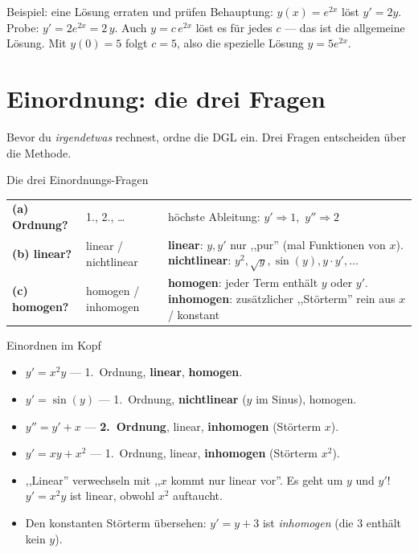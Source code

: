 \documentclass[a4paper,11pt]{article}
\begin{document}
\begin{bspbox}{Beispiel: eine Lösung erraten und prüfen}
Behauptung: $y(x)=e^{2x}$ löst $y'=2y$. Probe: $y'=2e^{2x}=2\,y$. \checkmark\;
Auch $y=c\,e^{2x}$ löst es für jedes $c$ — das ist die allgemeine Lösung. Mit $y(0)=5$
folgt $c=5$, also die spezielle Lösung $y=5e^{2x}$.
\end{bspbox}

\section{Einordnung: die drei Fragen}

Bevor du \emph{irgendetwas} rechnest, ordne die DGL ein. Drei Fragen entscheiden über die Methode.

\begin{defbox}{Die drei Einordnungs-Fragen}
\renewcommand{\arraystretch}{1.3}
\begin{tabular}{@{}p{3.1cm}p{4.1cm}p{7.5cm}@{}}
\textbf{(a) Ordnung?} & 1., 2., \dots & höchste Ableitung: $y'\Rightarrow1$,\ $y''\Rightarrow2$ \\
\textbf{(b) linear?} & linear / nichtlinear &
  \textbf{linear}: $y,y'$ nur ,,pur'' (mal Funktionen von $x$).
  \textbf{nichtlinear}: $y^2,\sqrt y,\sin(y),y\cdot y',\dots$ \\
\textbf{(c) homogen?} & homogen / inhomogen &
  \textbf{homogen}: jeder Term enthält $y$ oder $y'$.
  \textbf{inhomogen}: zusätzlicher ,,Störterm'' rein aus $x$ / konstant \\
\end{tabular}
\end{defbox}

\begin{bspbox}{Einordnen im Kopf}
\begin{itemize}[leftmargin=1.4em,itemsep=2pt]
  \item $y'=x^2y$ — 1.\ Ordnung, \textbf{linear}, \textbf{homogen}.
  \item $y'=\sin(y)$ — 1.\ Ordnung, \textbf{nichtlinear} ($y$ im Sinus), homogen.
  \item $y''=y'+x$ — \textbf{2.\ Ordnung}, linear, \textbf{inhomogen} (Störterm $x$).
  \item $y'=xy+x^2$ — 1.\ Ordnung, linear, \textbf{inhomogen} (Störterm $x^2$).
\end{itemize}
\end{bspbox}

\begin{fehlerbox}
\begin{itemize}[leftmargin=1.4em,itemsep=2pt]
  \item ,,Linear'' verwechseln mit ,,$x$ kommt nur linear vor''. Es geht um $y$ und $y'$!
        $y'=x^2y$ ist linear, obwohl $x^2$ auftaucht.
  \item Den konstanten Störterm übersehen: $y'=y+3$ ist \emph{inhomogen} (die $3$ enthält kein $y$).
\end{itemize}
\end{fehlerbox}
\end{document}
